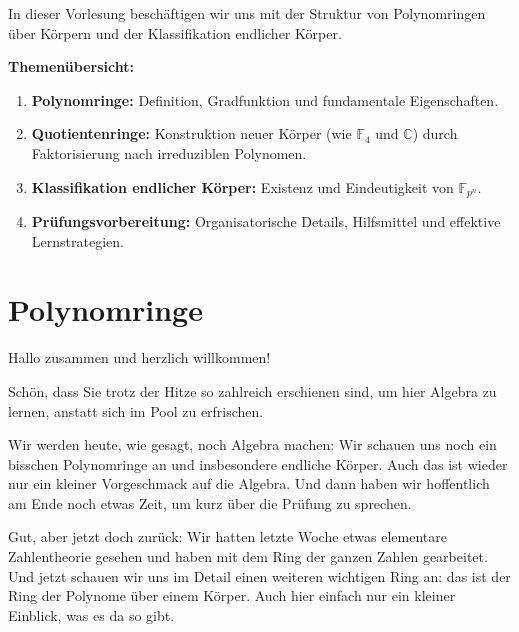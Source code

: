 

\begin{nice-box}
In dieser Vorlesung beschäftigen wir uns mit der Struktur von Polynomringen über Körpern und der Klassifikation endlicher Körper.

\textbf{Themenübersicht:}
\begin{enumerate}[label=\textbf{\arabic*.}]
    \item \textbf{Polynomringe:} Definition, Gradfunktion und fundamentale Eigenschaften.
    \item \textbf{Quotientenringe:} Konstruktion neuer Körper (wie $\mathbb{F}_4$ und $\mathbb{C}$) durch Faktorisierung nach irreduziblen Polynomen.
    \item \textbf{Klassifikation endlicher Körper:} Existenz und Eindeutigkeit von $\mathbb{F}_{p^n}$.
    \item \textbf{Prüfungsvorbereitung:} Organisatorische Details, Hilfsmittel und effektive Lernstrategien.
\end{enumerate}
\end{nice-box}

\section{Polynomringe}

\begin{spoken-clean}[00:00:00 - 00:01:50]
Hallo zusammen und herzlich willkommen!

Schön, dass Sie trotz der Hitze so zahlreich erschienen sind, um hier Algebra zu lernen, anstatt sich im Pool zu erfrischen.

Wir werden heute, wie gesagt, noch Algebra machen: Wir schauen uns noch ein bisschen Polynomringe an und insbesondere endliche Körper. Auch das ist wieder nur ein kleiner Vorgeschmack auf die Algebra. Und dann haben wir hoffentlich am Ende noch etwas Zeit, um kurz über die Prüfung zu sprechen.

Gut, aber jetzt doch zurück: Wir hatten letzte Woche etwas elementare Zahlentheorie gesehen und haben mit dem Ring der ganzen Zahlen gearbeitet. Und jetzt schauen wir uns im Detail einen weiteren wichtigen Ring an: das ist der Ring der Polynome über einem Körper. Auch hier einfach nur ein kleiner Einblick, was es da so gibt.
\end{spoken-clean}

